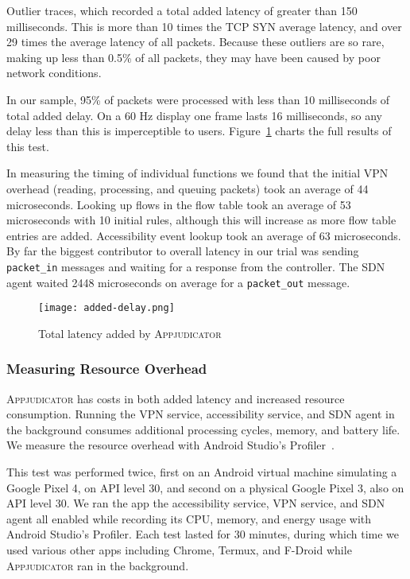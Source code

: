 Outlier traces, which recorded a total added latency of greater than 150
milliseconds. This is more than 10 times the TCP SYN average latency, and over
29 times the average latency of all packets. Because these outliers are so rare,
making up less than 0.5\% of all packets, they may have been caused by poor
network conditions.

In our sample, 95\% of packets were processed with less than 10 milliseconds
of total added delay. On a 60 Hz display one frame lasts 16 milliseconds, so any
delay less than this is imperceptible to users.
Figure~\ref{fig:added-delay-chart} charts the full results of this test.

In measuring the timing of individual functions we found that the initial VPN
overhead (reading, processing, and queuing packets) took an average of 44
microseconds. Looking up flows in the flow table took an average of 53
microseconds with 10 initial rules, although this will increase as more flow
table entries are added. Accessibility event lookup took an average of 63
microseconds. By far the biggest contributor to overall latency in our trial was
sending \texttt{packet\_in} messages and waiting for a response from the
controller. The SDN agent waited 2448 microseconds on average for a
\texttt{packet\_out} message.

\begin{figure}[h]
    \centering
	\texttt{[image: added-delay.png]}
	\caption{Total latency added by \textsc{Appjudicator}}
	\label{fig:added-delay-chart}
\end{figure}

\subsubsection{Measuring Resource Overhead}
\label{sec:measuring-resource-overhead}

\textsc{Appjudicator} has costs in both added latency and increased resource
consumption. Running the VPN service, accessibility service, and SDN agent in
the background consumes additional processing cycles, memory, and battery life.
We measure the resource overhead with Android Studio's
Profiler~\cite{androidprofiler}.

This test was performed twice, first on an Android virtual machine simulating a
Google Pixel 4, on API level 30, and second on a physical Google Pixel 3, also
on API level 30. We ran the app the accessibility service, VPN service, and SDN
agent all enabled while recording its CPU, memory, and energy usage with Android
Studio's Profiler. Each test lasted for 30 minutes, during which time we used
various other apps including Chrome, Termux, and F-Droid while
\textsc{Appjudicator} ran in the background.


